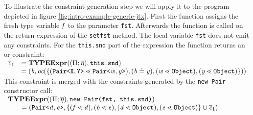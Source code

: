 \documentclass[a4paper,USenglish,cleveref, autoref, thm-restate]{lipics-v2021}
\begin{document}
\begin{example}\label{example:typeExpr}
To illustrate the constraint generation step we will apply it to the program depicted in
figure \ref{fig:intro-example-generic-jtx}.
First the \fjtype{} function assigns the fresh type variable $\mathit{ f }$ to the parameter \texttt{fst}.
Afterwards the \typeExpr{} function is called on the return expression of the \texttt{setfst} method.
The local variable \texttt{fst} does not emit any constraints.
For the \texttt{this.snd} part of the expression the \typeExpr{} function returns an or-constraint:\\
\noindent
$\begin{array}{ll}
\mathit{\overline{c}}_{1} &= \textbf{TYPEExpr}(({\Pi} ;
\overline{\mathtt{\eta}}), \texttt{this.snd}) \\
&= (\mathit{ b }, \textit{oc}(\{ 
(\mathtt{Pair \texttt{<} \texttt{X}, \texttt{Y} \texttt{>} } \lessdot \mathtt{Pair \texttt{<} \mathit{ w }, \mathit{ y } \texttt{>} }),
(\mathit{ b } \doteq \mathit{ y }), (\mathit{ w } \lessdot \texttt{Object}), (\mathit{ y } \lessdot \texttt{Object}) 
 \}) )
\end{array}$\\
\noindent
This constraint is merged with the constraints generated by the \texttt{new Pair} constructor call:
\\
\noindent
$\begin{array}{l}
\textbf{TYPEExpr}(({\Pi} ;
  \overline{\mathtt{\eta}}), \texttt{new Pair(fst, this.snd)})\\
  \quad \quad = (\mathtt{Pair \texttt{<} \mathit{ d },\mathit{ e } \texttt{>} }, \{ 
  (\mathit{ f } \lessdot \mathit{ d }), (\mathit{ b } \lessdot \mathit{ e }),
  (\mathit{ d } \lessdot \texttt{Object}), (\mathit{ e } \lessdot \texttt{Object}) \} \cup \mathit{\overline{c}}_1)
\end{array}$
\end{example}



% 



%

%





%

\end{document}
